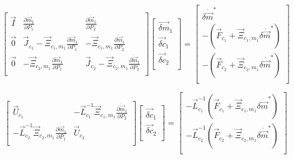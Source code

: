   
 \begin{equation}
\label{eqn:domainMatrix3}
 \begin{bmatrix} 
\vec{I} & \frac{\partial \dot{\vec{m}}_{1}}{\partial P_{1} } & \frac{\partial \dot{\vec{m}}_{1}}{\partial P_{2} }  \\
\vec{0} & \vec{J}_{c_1} - \vec{\Xi}_{c_1,m_1} \frac{\partial \dot{\vec{m}}_{1}}{\partial P_{1} } & - \vec{\Xi}_{c_1,m_1} \frac{\partial \dot{\vec{m}}_{1}}{\partial P_{2} }  \\
\vec{0} & -\vec{\Xi}_{c_2,m_1}\frac{\partial \dot{\vec{m}}_{1}}{\partial P_{1} } & \vec{J}_{c_2} - \vec{\Xi}_{c_2,m_1}\frac{\partial \dot{\vec{m}}_{1}}{\partial P_{2} } \\
 \end{bmatrix} \begin{bmatrix}
 \vec{\delta m}_{1} \\
 \vec{\delta c}_{1} \\
 \vec{\delta c}_{2} \\
\end{bmatrix}  = \begin{bmatrix}
 \delta \dot{\vec{m}}^{*} \\
 - ( \vec{F}_{c_1} + \vec{\Xi}_{c_1,m_1} \delta \dot{\vec{m}}^{*} ) \\
 - ( \vec{F}_{c_2} + \vec{\Xi}_{c_2,m_1} \delta \dot{\vec{m}}^{*} )\\
\end{bmatrix}
 \end{equation}

 \begin{equation}
\label{eqn:domainMatrix4}
 \begin{bmatrix} 
\vec{U}_{c_1} & - \vec{L}_{c_1}^{-1} \vec{\Xi}_{c_1,m_1} \frac{\partial \dot{\vec{m}}_{1}}{\partial P_{2} }  \\
-\vec{L}_{c_2}^{-1} \vec{\Xi}_{c_2,m_1}\frac{\partial \dot{\vec{m}}_{1}}{\partial P_{1} } & \vec{U}_{c_2} \\
 \end{bmatrix} \begin{bmatrix}
 \vec{\delta c}_{1} \\
 \vec{\delta c}_{2} \\
\end{bmatrix}  = \begin{bmatrix}
 - \vec{L}_{c_1}^{-1} ( \vec{F}_{c_1} + \vec{\Xi}_{c_1,m_1} \delta \dot{\vec{m}}^{*} ) \\
 - \vec{L}_{c_2}^{-1} ( \vec{F}_{c_2} + \vec{\Xi}_{c_2,m_1} \delta \dot{\vec{m}}^{*} )\\
\end{bmatrix}
 \end{equation}
 
